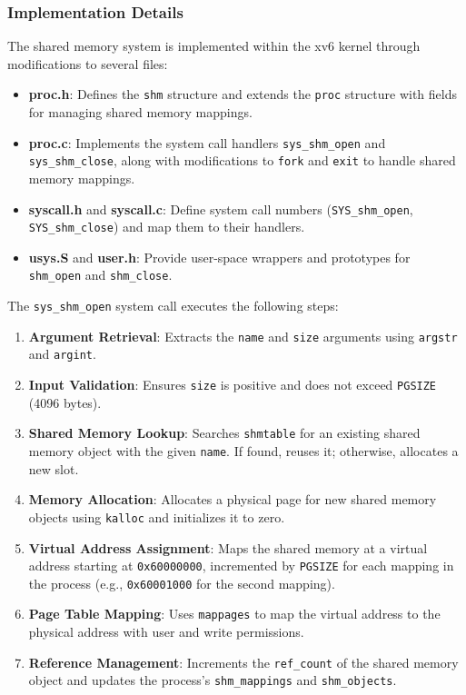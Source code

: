 \documentclass[12pt]{article}
\begin{document}
\subsubsection{Implementation Details}
\label{subsubsec:shared-memory-implementation-details}

The shared memory system is implemented within the xv6 kernel through modifications to several files:

\begin{itemize}
  \item \textbf{proc.h}: Defines the \texttt{shm} structure and extends the \texttt{proc} structure with fields for managing shared memory mappings.
  \item \textbf{proc.c}: Implements the system call handlers \texttt{sys\_shm\_open} and \texttt{sys\_shm\_close}, along with modifications to \texttt{fork} and \texttt{exit} to handle shared memory mappings.
  \item \textbf{syscall.h} and \textbf{syscall.c}: Define system call numbers (\texttt{SYS\_shm\_open}, \texttt{SYS\_shm\_close}) and map them to their handlers.
  \item \textbf{usys.S} and \textbf{user.h}: Provide user-space wrappers and prototypes for \texttt{shm\_open} and \texttt{shm\_close}.
\end{itemize}

The \texttt{sys\_shm\_open} system call executes the following steps:
\begin{enumerate}
  \item \textbf{Argument Retrieval}: Extracts the \texttt{name} and \texttt{size} arguments using \texttt{argstr} and \texttt{argint}.
  \item \textbf{Input Validation}: Ensures \texttt{size} is positive and does not exceed \texttt{PGSIZE} (4096 bytes).
  \item \textbf{Shared Memory Lookup}: Searches \texttt{shmtable} for an existing shared memory object with the given \texttt{name}. If found, reuses it; otherwise, allocates a new slot.
  \item \textbf{Memory Allocation}: Allocates a physical page for new shared memory objects using \texttt{kalloc} and initializes it to zero.
  \item \textbf{Virtual Address Assignment}: Maps the shared memory at a virtual address starting at \texttt{0x60000000}, incremented by \texttt{PGSIZE} for each mapping in the process (e.g., \texttt{0x60001000} for the second mapping).
  \item \textbf{Page Table Mapping}: Uses \texttt{mappages} to map the virtual address to the physical address with user and write permissions.
  \item \textbf{Reference Management}: Increments the \texttt{ref\_count} of the shared memory object and updates the process’s \texttt{shm\_mappings} and \texttt{shm\_objects}.
\end{enumerate}
\end{document}

